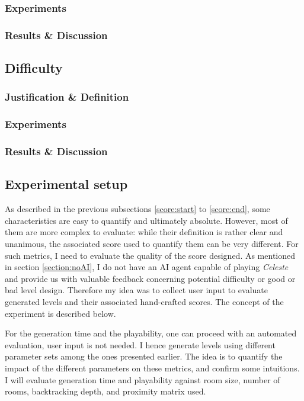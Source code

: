 \documentclass{article}
\newcommand{\Celeste}{\textit{Celeste} }
\begin{document}
\subsubsection{Experiments}
\subsubsection{Results \& Discussion}

\subsection{Difficulty}
\subsubsection{Justification \& Definition}
\subsubsection{Experiments}
\subsubsection{Results \& Discussion}


\subsection{Experimental setup}
As described in the previous subsections \ref{score:start} to \ref{score:end}, some characteristics are easy to quantify and ultimately absolute. However, most of them are more complex to evaluate: while their definition is rather clear and unanimous, the associated score used to quantify them can be very different. For such metrics, I need to evaluate the quality of the score designed. As mentioned in section \ref{section:noAI}, I do not have an AI agent capable of playing \Celeste and provide us with valuable feedback concerning potential difficulty or good or bad level design. Therefore my idea was to collect user input to evaluate generated levels and their associated hand-crafted scores. The concept of the experiment is described below.

\noindent For the generation time and the playability, one can proceed with an automated evaluation, user input is not needed. I hence generate levels using different parameter sets among the ones presented earlier. The idea is to quantify the impact of the different parameters on these metrics, and confirm some intuitions. I will evaluate generation time and playability against room size, number of rooms, backtracking depth, and proximity matrix used.
\end{document}
